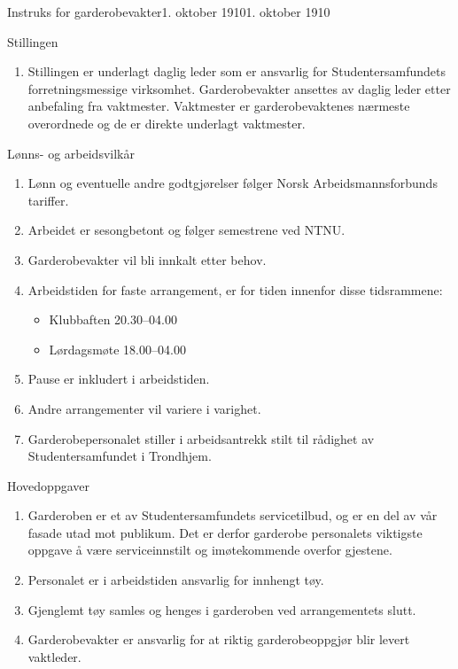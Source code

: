 \begin{instruks}{Instruks for garderobevakter}{1. oktober 1910}{1. oktober 1910}
    
    \begin{instruksledd}{Stillingen}
        \begin{enumerate}
            \item Stillingen er underlagt daglig leder som er ansvarlig for Studentersamfundets forretningsmessige virksomhet.
                Garderobevakter ansettes av daglig leder etter anbefaling fra vaktmester. Vaktmester er garderobevaktenes nærmeste
                overordnede og de er direkte underlagt vaktmester.
        \end{enumerate}    
    \end{instruksledd}

    \begin{instruksledd}{Lønns- og arbeidsvilkår}
        \begin{enumerate}
            \item Lønn og eventuelle andre godtgjørelser følger Norsk Arbeidsmannsforbunds tariffer.
            \item Arbeidet er sesongbetont og følger semestrene ved NTNU.
            \item Garderobevakter vil bli innkalt etter behov.
            \item Arbeidstiden for faste arrangement, er for tiden innenfor disse tidsrammene:
                \begin{itemize}
                    \item Klubbaften 20.30--04.00
                    \item Lørdagsmøte 18.00--04.00
                \end{itemize}
            \item Pause er inkludert i arbeidstiden.
            \item Andre arrangementer vil variere i varighet.
            \item Garderobepersonalet stiller i arbeidsantrekk stilt til rådighet av Studentersamfundet i Trondhjem.
        \end{enumerate}    
    \end{instruksledd}

    \begin{instruksledd}{Hovedoppgaver}
        \begin{enumerate}
            \item Garderoben er et av Studentersamfundets servicetilbud, og er en del av vår fasade 
                utad mot publikum. Det er derfor garderobe personalets viktigste oppgave å være serviceinnstilt og 
                imøtekommende overfor gjestene.
            \item Personalet er i arbeidstiden ansvarlig for innhengt tøy.
            \item Gjenglemt tøy samles og henges i garderoben ved arrangementets slutt.
            \item Garderobevakter er ansvarlig for at riktig garderobeoppgjør blir levert vaktleder.
        \end{enumerate}
    \end{instruksledd}


\end{instruks}
